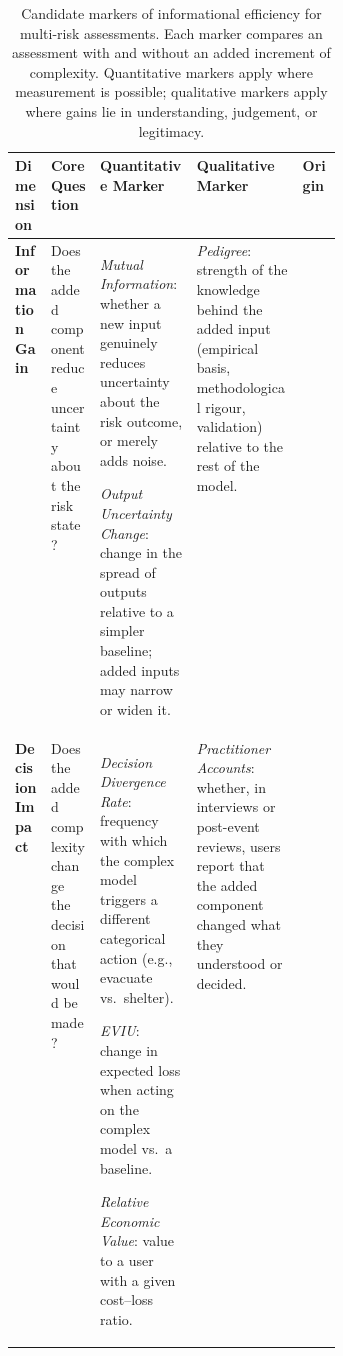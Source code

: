 \documentclass[12pt]{article}
\begin{document}
\begin{table}
\centering
\caption{Candidate markers of informational efficiency for multi-risk assessments. Each marker compares an assessment with and without an added increment of complexity. Quantitative markers apply where measurement is possible; qualitative markers apply where gains lie in understanding, judgement, or legitimacy.}
\label{tab:efficiency_metrics}
\footnotesize
\setlength{\tabcolsep}{3pt}
\renewcommand{\arraystretch}{1.1}
\begin{tabularx}{\linewidth}{@{} >{\raggedright\arraybackslash}p{0.11\linewidth} >{\raggedright\arraybackslash}p{0.15\linewidth} >{\raggedright\arraybackslash}X >{\raggedright\arraybackslash}X >{\raggedright\arraybackslash}p{0.12\linewidth} @{}}
\toprule
\textbf{Dimension} & \textbf{Core Question} & \textbf{Quantitative Marker} & \textbf{Qualitative Marker} & \textbf{Origin} \\
\midrule

\textbf{Information Gain} & Does the added component reduce uncertainty about the risk state? &
\textit{Mutual Information}: whether a new input genuinely reduces uncertainty about the risk outcome, or merely adds noise.\par
\textit{Output Uncertainty Change}: change in the spread of outputs relative to a simpler baseline; added inputs may narrow or widen it. &
\textit{Pedigree}: strength of the knowledge behind the added input (empirical basis, methodological rigour, validation) relative to the rest of the model. &
\citep{shannon1948mathematical}\par \citep{puy2022models}\par \citep{vandersluijs2005combining} \\

\midrule

\textbf{Decision Impact} & Does the added complexity change the decision that would be made? &
\textit{Decision Divergence Rate}: frequency with which the complex model triggers a different categorical action (e.g., evacuate vs.\ shelter).\par
\textit{EVIU}: change in expected loss when acting on the complex model vs.\ a baseline.\par
\textit{Relative Economic Value}: value to a user with a given cost--loss ratio. &
\textit{Practitioner Accounts}: whether, in interviews or post-event reviews, users report that the added component changed what they understood or decided. &
\citep{morgan1990uncertainty}\par \citep{murphy1993good}\par \citep{richardson2000skill} \\


\end{tabularx}
\end{table}
\end{document}

